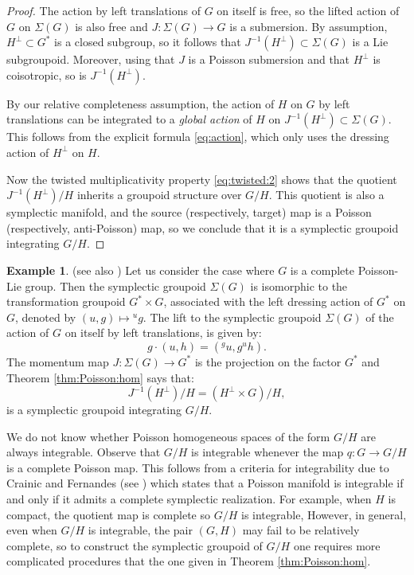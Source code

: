 \documentclass[a4paper,11pt]{amsart}
\theoremstyle{definition}
\newtheorem{ex}[thm]{Example}
\theoremstyle{remark}
\begin{document}
\begin{proof}
The action by left translations of $G$ on itself is free, so the lifted action of $G$ on $\Sigma(G)$ is also
free and $J:\Sigma(G)\to G$ is a submersion. By assumption, $H^\perp\subset G^*$ is a closed subgroup, so it
follows that $J^{-1}(H^\perp)\subset\Sigma(G)$ is a Lie subgroupoid. Moreover, using that $J$ is a Poisson
submersion and that $H^\perp$ is coisotropic, so is $J^{-1}(H^\perp)$.

By our relative completeness assumption, the action of $H$ on $G$
by left translations can be integrated to a \emph{global action}
of $H$ on $J^{-1}(H^\perp)\subset\Sigma(G)$. This follows from the
explicit formula \eqref{eq:action}, which only uses the dressing
action of $H^\perp$ on $H$.

Now the twisted multiplicativity property \eqref{eq:twisted:2} shows that the quotient $J^{-1}(H^\perp)/H$
inherits a groupoid structure over $G/H$. This quotient is also a symplectic manifold, and the source
(respectively, target) map is a Poisson (respectively, anti-Poisson) map, so we conclude that it is a symplectic
groupoid integrating $G/H$.
\end{proof}

\begin{ex}(see also \cite[Remark 5.13]{Lu3})
Let us consider the case where $G$ is a complete Poisson-Lie group. Then the symplectic groupoid $\Sigma(G)$ is
isomorphic to the transformation groupoid $G^*\times G$, associated with the left dressing action of $G^*$ on
$G$, denoted by  $(u,g)\mapsto {}^ug$. The lift to the symplectic groupoid $\Sigma(G)$ of the action of $G$ on
itself by left translations, is given by:
\[ g\cdot (u,h)=(^gu,g^uh).\]
The momentum map $J:\Sigma(G)\to G^*$ is the projection on the factor $G^*$ and Theorem \ref{thm:Poisson:hom}
says that:
\[ J^{-1}(H^\perp )/H =(H^\perp \times G)/H,\]
is a symplectic groupoid integrating $G/H$.
\end{ex}

We do not know whether Poisson homogeneous spaces of the form $G/H$ are always integrable. Observe that $G/H$ is
integrable whenever the map $q:G\to G/H$ is a complete Poisson map. This follows from a criteria for
integrability due to Crainic and Fernandes (see \cite[Theorem 8]{CrFe2}) which states that a Poisson manifold is
integrable if and only if it admits a complete symplectic realization. For example, when $H$ is compact, the
quotient map is complete so $G/H$ is integrable, However, in general, even when $G/H$ is integrable, the pair
$(G,H)$ may fail to be relatively complete, so to construct the symplectic groupoid of $G/H$ one requires more
complicated procedures that the one given in Theorem \ref{thm:Poisson:hom}.
\end{document}
